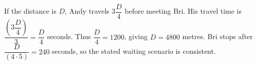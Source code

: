 If the distance is $D$, Andy travels $3\dfrac{D}{4}$ before meeting Bri. His travel time is $\dfrac{(3\dfrac{D}{4})}{3}=\dfrac{D}{4}$ seconds. Thus $\dfrac{D}{4}=1200$, giving $\boxed{D=4800}$ metres. Bri stops after $\dfrac{D}{(4\cdot5)}=240$ seconds, so the stated waiting scenario is consistent.
